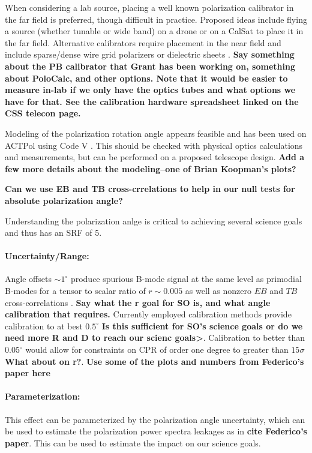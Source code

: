 When considering a lab source, placing a well known polarization
calibrator in the far field is preferred, though difficult in practice.
Proposed ideas include flying a source (whether tunable or wide band) on a
drone or on a CalSat to place it in the far field. Alternative calibrators
require placement in the near field and include sparse/dense wire grid
polarizers or dielectric sheets \cite{Takahashi2010, 2016arXiv160701825K}. \textbf{Say something about the PB calibrator that Grant has been working on, something about PoloCalc, and other options. Note that it would be easier to measure in-lab if we only have the optics tubes and what options we have for that. See the calibration hardware spreadsheet linked on the CSS telecon page.}

Modeling of the polarization rotation angle appears feasible and has been used
on ACTPol using Code V \cite{2016arXiv160701825K}. This should be checked with
physical optics calculations and measurements, but can be performed on a proposed telescope
design. \textbf{Add a few more details about the modeling--one of Brian Koopman's plots?}

\textbf{Can we use EB and TB cross-crrelations to help in our null tests for absolute polarization angle?}

Understanding the polarization anlge is critical to achieving several science goals and thus has an SRF of 5.

\paragraph{Uncertainty/Range:}

Angle offsets $\sim 1^{\circ}$ produce spurious B-mode signal at the same level
as primodial B-modes for a tensor to scalar ratio of $r \sim 0.005$ as well as
nonzero $EB$ and $TB$ cross-correlations \cite{doi:10.1142/S0218271816400125}. \textbf{Say what the r goal for SO is, and what angle calibration that requires.}
Currently employed calibration methods provide calibration to at best
$0.5^{\circ}$ \cite{2016MNRAS.455.1981K} \textbf{Is this sufficient for SO's science goals or do we need more R and D to reach our scienc goals>}. Calibration to better than
$0.05^{\circ}$ would allow for constraints on CPR of order one degree to
greater than $15\sigma$ \cite{2016MNRAS.455.1981K} \textbf{What about on r?}.  \textbf{Use some of the plots and numbers from Federico's paper here}

\paragraph{Parameterization:}
This effect can be parameterized by the polarization angle uncertainty, which can be used to estimate the polarization power spectra leakages as in \textbf{cite Federico's paper}. This can be used to estimate the impact on our science goals.
